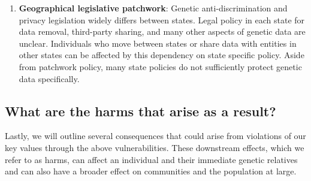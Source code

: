 \begin{enumerate}
    \item \textbf{Geographical legislative patchwork}: Genetic anti-discrimination and privacy legislation widely differs between states. Legal policy in each state for data removal, third-party sharing, and many other aspects of genetic data are unclear. Individuals who move between states or share data with entities in other states can be affected by this dependency on state specific policy. Aside from patchwork policy, many state policies do not sufficiently protect genetic data specifically. 
\end{enumerate}


\subsection{What are the harms that arise as a result?}
Lastly, we will outline several consequences that could arise from violations of our key values through the above vulnerabilities. These downstream effects, which we refer to as harms, can affect an individual and their immediate genetic relatives and 
can also have a broader effect on communities and the population at large.


